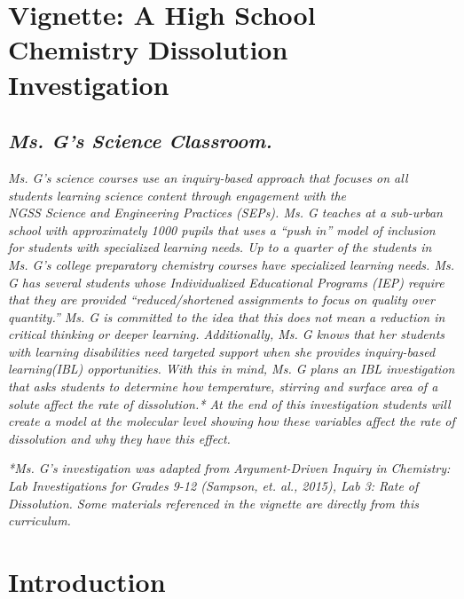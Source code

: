 \documentclass[11pt]{sig-alternate}
\begin{document}
\pagebreak
\pagebreak

\vspace{5mm}
\section*{\vspace{140mm}}
\section*{Vignette: A High School Chemistry Dissolution Investigation}
\begin{large}
\subsection*{\textit{\textbf{Ms. G’s Science Classroom.}}}
\textit{Ms. G’s science courses use an inquiry-based approach that focuses on all students learning science content through engagement with the \\NGSS Science and Engineering Practices (SEPs). Ms. G teaches at a sub-urban school with approximately 1000 pupils that uses a “push in” model of inclusion for students with specialized learning needs. Up to a quarter of the students in Ms. G’s college preparatory chemistry courses have specialized learning needs. Ms. G has several students whose Individualized Educational Programs (IEP) require that they are provided “reduced/shortened assignments to focus on quality over quantity.” Ms. G is committed to the idea that this does not mean a reduction in critical thinking or deeper learning. Additionally, Ms. G knows that her students with learning disabilities need targeted support when she provides inquiry-based learning(IBL) opportunities. With this in mind, Ms. G plans an IBL investigation that asks students to determine how temperature, stirring and surface area of a solute affect the rate of dissolution.* At the end of this investigation students will create a model at the molecular level showing how these variables affect the rate of dissolution and why they have this effect.}
 
\textit{*Ms. G’s investigation was adapted from Argu\-ment-Driven Inquiry in Chemistry: Lab Investigations for Grades 9-12 (Sampson, et. al., 2015), Lab 3: Rate of Dissolution. Some materials referenced in the vignette are directly from this curriculum.}

\newpage
\section*{Introduction}

\end{large}
\end{document}
